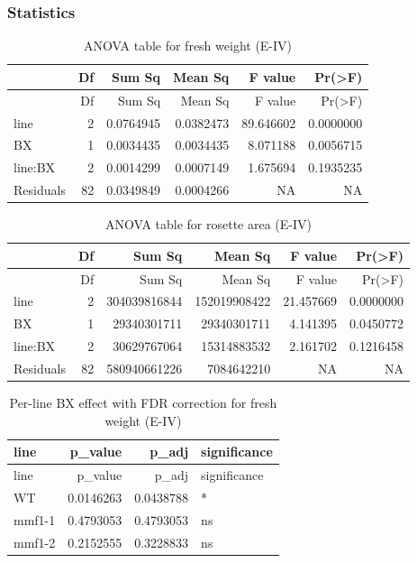 \documentclass[
  10pt,
]{article}
\begin{document}
\newpage

\subsubsection{Statistics}\label{statistics-1}

\begin{longtable}[]{@{}lrrrrr@{}}
\caption{ANOVA table for fresh weight (E-IV)}\tabularnewline
\toprule\noalign{}
& Df & Sum Sq & Mean Sq & F value & Pr(\textgreater F) \\
\midrule\noalign{}
\endfirsthead
\toprule\noalign{}
& Df & Sum Sq & Mean Sq & F value & Pr(\textgreater F) \\
\midrule\noalign{}
\endhead
\bottomrule\noalign{}
\endlastfoot
line & 2 & 0.0764945 & 0.0382473 & 89.646602 & 0.0000000 \\
BX & 1 & 0.0034435 & 0.0034435 & 8.071188 & 0.0056715 \\
line:BX & 2 & 0.0014299 & 0.0007149 & 1.675694 & 0.1935235 \\
Residuals & 82 & 0.0349849 & 0.0004266 & NA & NA \\
\end{longtable}

\begin{longtable}[]{@{}lrrrrr@{}}
\caption{ANOVA table for rosette area (E-IV)}\tabularnewline
\toprule\noalign{}
& Df & Sum Sq & Mean Sq & F value & Pr(\textgreater F) \\
\midrule\noalign{}
\endfirsthead
\toprule\noalign{}
& Df & Sum Sq & Mean Sq & F value & Pr(\textgreater F) \\
\midrule\noalign{}
\endhead
\bottomrule\noalign{}
\endlastfoot
line & 2 & 304039816844 & 152019908422 & 21.457669 & 0.0000000 \\
BX & 1 & 29340301711 & 29340301711 & 4.141395 & 0.0450772 \\
line:BX & 2 & 30629767064 & 15314883532 & 2.161702 & 0.1216458 \\
Residuals & 82 & 580940661226 & 7084642210 & NA & NA \\
\end{longtable}

\begin{longtable}[]{@{}lrrl@{}}
\caption{Per-line BX effect with FDR correction for fresh weight
(E-IV)}\tabularnewline
\toprule\noalign{}
line & p\_value & p\_adj & significance \\
\midrule\noalign{}
\endfirsthead
\toprule\noalign{}
line & p\_value & p\_adj & significance \\
\midrule\noalign{}
\endhead
\bottomrule\noalign{}
\endlastfoot
WT & 0.0146263 & 0.0438788 & * \\
mmf1-1 & 0.4793053 & 0.4793053 & ns \\
mmf1-2 & 0.2152555 & 0.3228833 & ns \\
\end{longtable}
\end{document}
